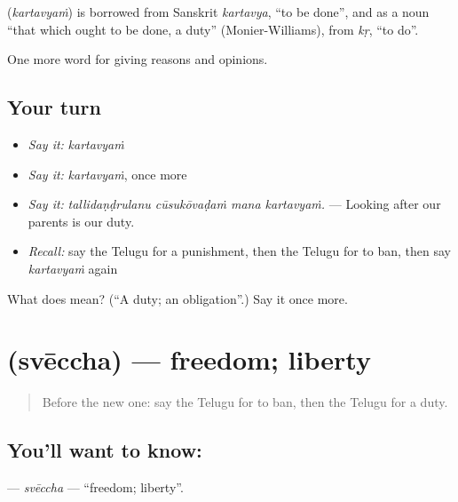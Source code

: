 \begin{cousinweb}
\textbf{} (\emph{kartavyaṁ}) is borrowed from Sanskrit \emph{kartavya}, \textquotedblleft{}to be done\textquotedblright{}, and as a noun \textquotedblleft{}that which ought to be done, a duty\textquotedblright{} (Monier-Williams), from \emph{kṛ}, \textquotedblleft{}to do\textquotedblright{}.
\end{cousinweb}

\begin{grammarlens}[title={What you've built}]
One more word for giving reasons and opinions.
\end{grammarlens}

\subsection*{Your turn}
\begin{itemize}
\raggedright
  \item \emph{Say it:} \emph{kartavyaṁ}
  \item \emph{Say it:} \emph{kartavyaṁ}, once more
  \item \emph{Say it:} \emph{tallidaṇḍrulanu cūsukōvaḍaṁ mana kartavyaṁ.} — Looking after our parents is our duty.
  \item \emph{Recall:} say the Telugu for a punishment, then the Telugu for to ban, then say \emph{kartavyaṁ} again
\end{itemize}

\begin{tcolorbox}[breakable,colback=teal!4,colframe=teal!35!black,title={Before you move on}]
What does  mean? (\textquotedblleft{}A duty; an obligation\textquotedblright{}.) Say it once more.
\end{tcolorbox}
\section[\texorpdfstring{\te{స్వేచ్ఛ} (svēccha)}{స్వేచ్ఛ (svēccha)}]{ (svēccha) — freedom; liberty}

\label{lesson:TE-C399-sveccha}



\begin{quote}
Before the new one: say the Telugu for to ban, then the Telugu for a duty.
\end{quote}

\subsection*{You'll want to know: }
\textbf{} — \emph{svēccha} — \textquotedblleft{}freedom; liberty\textquotedblright{}.

